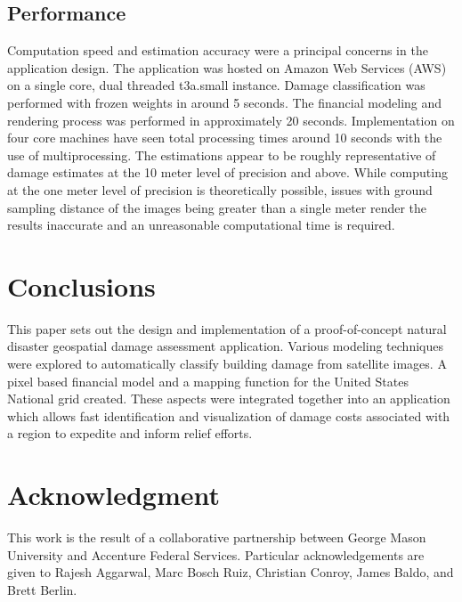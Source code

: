 \documentclass[conference]{IEEEtran}
\begin{document}
\subsection{Performance}
Computation speed and estimation accuracy were a principal concerns in the application design. The application was hosted on Amazon Web Services (AWS) on a single core, dual threaded t3a.small instance. Damage classification was performed with frozen weights in around 5 seconds. The financial modeling and rendering process was performed in approximately 20 seconds. Implementation on four core machines have seen total processing times around 10 seconds with the use of multiprocessing. The estimations appear to be roughly representative of damage estimates at the 10 meter level of precision and above. While computing at the one meter level of precision is theoretically possible, issues with ground sampling distance of the images being greater than a single meter render the results inaccurate and an unreasonable computational time is required.

\section{Conclusions}
This paper sets out the design and implementation of a proof-of-concept natural disaster geospatial damage assessment application. Various modeling techniques were explored to automatically classify building damage from satellite images. A pixel based financial model and a mapping function for the United States National grid created. These aspects were integrated together into an application which allows fast identification and visualization of damage costs associated with a region to expedite and inform relief efforts.

\section*{Acknowledgment}

This work is the result of a collaborative partnership between George Mason University and Accenture Federal Services. Particular acknowledgements are given to Rajesh Aggarwal, Marc Bosch Ruiz, Christian Conroy, James Baldo, and Brett Berlin.  
\end{document}
